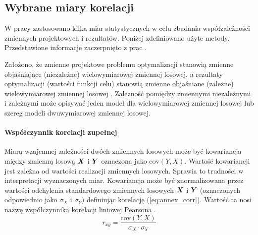 
\renewcommand{\appendixname}{Załącznik}
\begin{appendices}

\chapter{Wybrane miary korelacji}

\setcounter{figure}{0}   
\setcounter{equation}{0}   

W pracy zastosowano kilka miar statystycznych w celu zbadania współzależności zmiennych projektowych i rezultatów. Poniżej zdefiniowano użyte metody. Przedstawione informacje zaczerpnięto z prac \cite{Czaja2000,Vargha2013,Tabachnick}.

Założono, że zmienne projektowe problemu optymalizacji stanowią zmienne objaśniające (niezależne) wielowymiarowej zmiennej losowej, a rezultaty optymalizacji (wartości funkcji celu) stanowią zmienne objaśniane (zależne) wielowymiarowej zmiennej losowej \cite{Czaja2000}. Zależność pomiędzy zmiennymi niezależnymi i zależnymi może opisywać jeden model dla wielowymiarowej zmiennej losowej lub szereg modeli dwuwymiarowej zmiennej losowej.

\subsubsection{Współczynnik korelacji zupełnej}
Miarą wzajemnej zależności dwóch zmiennych losowych może być kowariancja między zmienną losową $\bm{X}$ i $\bm{Y}$ oznaczona jako $\mathrm{cov}(Y,X)$. Wartość kowariancji jest zależna od wartości realizacji zmiennych losowych. Sprawia to trudności w interpretacji wyznaczonych miar. Kowariancja może być znormalizowana przez wartości odchylenia standardowego zmiennych losowych $\bm{X}$ i $\bm{Y}$ (oznaczonych odpowiednio jako $\sigma_X$ i $\sigma_Y$) definiując korelację (\ref{eq:annex_corr}). Wartość ta nosi nazwę współczynnika korelacji liniowej Pearsona .
\begin{equation} \label{eq:annex_corr}
	r_{xy}=\frac{\mathrm{cov}(Y,X)}{\sigma_X\cdot\sigma_Y}
\end{equation}


\end{appendices}
